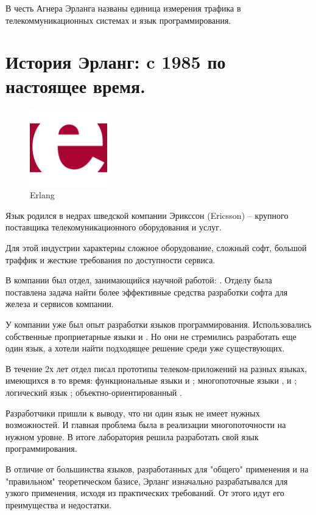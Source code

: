 В честь Агнера Эрланга названы единица измерения трафика в телекоммуникационных системах и язык программирования.

\section{История Эрланг: c 1985 по настоящее время.}

\begin{figure}[h]
  \centering
  \includegraphics[width=0.3\textwidth]{../lesson_02/img/erlang_logo.png}
  \caption{Erlang}
\end{figure}

Язык  родился в недрах шведской компании Эрикссон (Ericsson) -- крупного поставщика телекомуникационного оборудования и услуг.

Для этой индустрии характерны сложное оборудование, сложный софт, большой траффик и жесткие требования по доступности сервиса.

В компании был отдел, занимающийся научной работой: . Отделу была поставлена задача найти более эффективные средства разработки софта для железа и сервисов компании.

У компании уже был опыт разработки языков программирования. Использовались собственные проприетарные языки  и . Но они не стремились разработать еще один язык, а хотели найти подходящее решение среди уже существующих.

В течение 2х лет отдел писал прототипы телеком-приложений на разных языках, имеющихся в то время:
\blist
\e функциональные языки  и ;
\e многопоточные языки ,  и ;
\e логический язык ;
\e объектно-ориентированный .
\elist

Разработчики пришли к выводу, что ни один язык не имеет нужных возможностей. И главная проблема была в реализации многопоточности на нужном уровне. В итоге лаборатория решила разработать свой язык программирования.

В отличие от большинства языков, разработанных для "общего" применения и на "правильном" теоретическом базисе, Эрланг изначально разрабатывался для узкого применения, исходя из практических требований. От этого идут его преимущества и недостатки.

